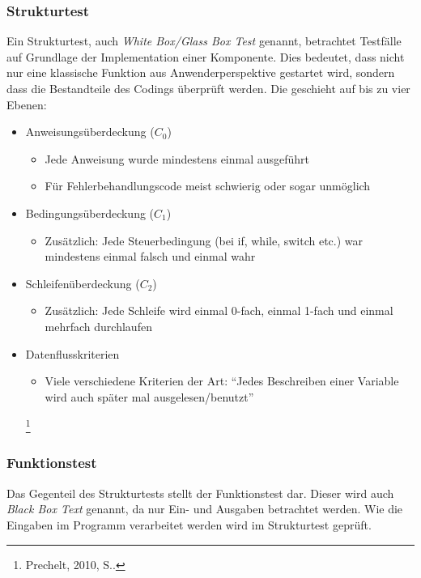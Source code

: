             \subsubsection{Strukturtest}
                Ein Strukturtest, auch \emph{White Box/Glass Box Test} genannt, betrachtet Testfälle auf Grundlage der Implementation einer Komponente.
                Dies bedeutet, dass nicht nur eine klassische Funktion aus Anwenderperspektive gestartet wird, sondern dass die Bestandteile des Codings überprüft werden. Die geschieht auf bis zu vier Ebenen:
                \begin{itemize}
                  \item Anweisungsüberdeckung ($C_0$)
                    \begin{itemize}
                      \item Jede Anweisung wurde mindestens einmal ausgeführt
                      \item Für Fehlerbehandlungscode meist schwierig oder sogar unmöglich
                    \end{itemize}
                  \item Bedingungsüberdeckung ($C_1$)
                    \begin{itemize}
                      \item Zusätzlich: Jede Steuerbedingung (bei if, while, switch etc.) war mindestens einmal falsch und einmal wahr
                    \end{itemize}
                  \item Schleifenüberdeckung ($C_2$)
                    \begin{itemize}
                      \item Zusätzlich: Jede Schleife wird einmal 0-fach, einmal 1-fach und einmal mehrfach durchlaufen
                    \end{itemize}
                  \item Datenflusskriterien
                      \begin{itemize}
                        \item Viele verschiedene Kriterien der Art: \enquote{Jedes Beschreiben einer Variable wird auch später mal ausgelesen/benutzt}
                      \end{itemize}
                      \footnote{Prechelt, 2010, S..}
                \end{itemize}

            \subsubsection{Funktionstest}
                Das Gegenteil des Strukturtests stellt der Funktionstest dar. Dieser wird auch \emph{Black Box Text} genannt, da nur Ein- und Ausgaben betrachtet werden. Wie die Eingaben im Programm verarbeitet werden wird im Strukturtest geprüft.

